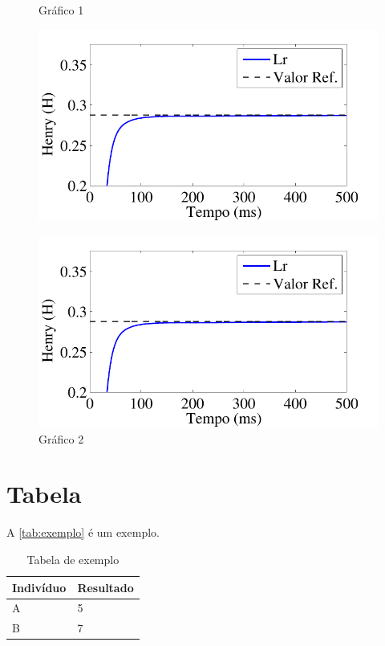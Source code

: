 \begin{figure}[htb]
 \centering
  \begin{minipage}{0.45\textwidth}
    \caption{Gráfico 1}
    \label{fig:grafico1}
    \centering
    \includegraphics[scale=0.15]{fig/grafico.pdf}
  \end{minipage}
  \hfill
  \begin{minipage}{0.45\textwidth}
    \caption{Gráfico 2}
    \label{fig:grafico2}
    \centering
    \includegraphics[scale=0.15]{fig/grafico.pdf}
  \end{minipage}
\end{figure}

\section{Tabela}\label{texto:exemplo:tabela}

A \autoref{tab:exemplo} é um exemplo.

\begin{table}[htb]
    \caption{Tabela de exemplo}
    \label{tab:exemplo}
    \centering
    \ABNTEXfontereduzida
    \begin{tabular}{l|l}
        \hline
        \textbf{Indivíduo} & \textbf{Resultado} \\
        \hline
        A & 5 \\
        \hline
        B & 7 \\
        \hline
    \end{tabular}
\end{table}

